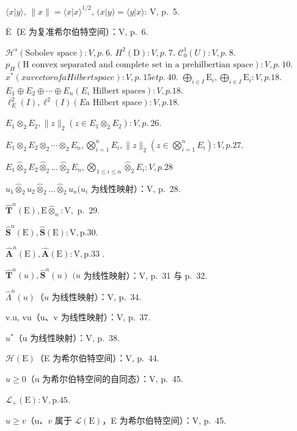 \(\langle x|y\rangle\), \(\|x\| = \langle x|x\rangle^{1/2}\), \((x|y) = \langle y|x\rangle\): V, p.~5.

\(\overline{\mathrm{E}}\)（E 为复准希尔伯特空间）：V, p.~6.

\(\mathcal{H}^{s} (\text {Sobolev space}): V, p.~6.\) \(H^{2}(\text {D}): V, p.~7.\) \(\mathcal{C}_{0}^{1}(U): V, p.~8.\) \(p_{H} (\text {H convex separated and complete set in a prehilbertian space}): V, p.~10.\) \(x^{*} (x a vector of a Hilbert space): V, p.~15 et p.~40.\) \(\bigoplus_{i\in I}\mathrm{E}_{i},\bigoplus_{i\in I}\mathrm{E}_{i}:V,p.18.\) \(E_{1}\oplus E_{2}\oplus\cdots\oplus E_{n} (E_{i}\text { Hilbert spaces}):V,p.18.\) \(\ell_{E}^{2}(I),\ell^{2}(I)(E\text {a Hilbert space}):V,p.18.\)

\(E_{1} \otimes_{2} E_{2}, \|z\|_{2} (z \in E_{1} \otimes_{2} E_{2}) : V, p.~26.\)

\(E_{1} \otimes_{2} E_{2} \otimes_{2} \cdots \otimes_{2} E_{n}, \bigotimes_{i=1}^{n} E_{i}, \|z\|_{2} \left( z \in \bigotimes_{i=1}^{n} E_{i} \right) : V, p. 27.\)

\(E_{1} \hat{\otimes}_{2} E_{2} \hat{\otimes}_{2} \ldots \hat{\otimes}_{2} E_{n}, \bigotimes_{1 \leqslant i \leqslant n} \hat{\otimes}_{2} E_{i}: V, p. 28\)

\(u_{1}\hat{\otimes}_{2}u_{2}\hat{\otimes}_{2}\ldots \hat{\otimes}_{2}u_{n}(u_{i}\) 为线性映射）：V, p.~28.

\(\hat{\mathbf{T}}^n (\mathrm{E}),\mathrm{E}\hat{\otimes}_n:\mathrm{V},\) p.~29.

\(\hat{\mathbf{S}}^{n}(\mathrm{E}), \hat{\mathbf{S}}(\mathrm{E}) : \mathrm{V}, \mathrm{p.} 30.\)

\(\hat{\mathbf{A}}^{n}(\mathrm{E}), \hat{\mathbf{A}}(\mathrm{E}) : \mathrm{V}, \mathrm{p. 33}\) .

\(\hat{\mathbf{T}}^n (u),\hat{\mathbf{S}}^n (u)\) \((u\) 为线性映射）：V, p.~31 与 p.~32.

\(\hat{\Lambda}^n (u)\)（\(u\) 为线性映射）：V, p.~34.

v.u, vu（u、v 为线性映射）：V, p.~37.

\(u^{*}\)（u 为线性映射）：V, p.~38.

\(\mathcal{H}(\mathrm{E})\)（E 为希尔伯特空间）：V, p.~44.

\(u \geqslant 0\)（u 为希尔伯特空间的自同态）：V, p.~45.

\(\mathcal{L}_{+}(\mathrm{E}):\mathrm{V},\mathrm{p.}45.\)

\(u \geqslant v\)（u、\(v\) 属于 \(\mathcal{L}(\mathrm{E})\)，E 为希尔伯特空间）：V, p.~45.

